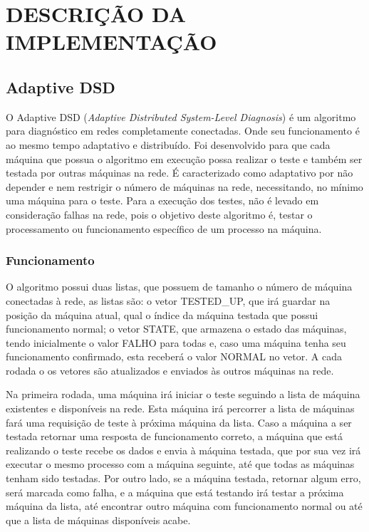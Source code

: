 
\chapter{DESCRIÇÃO DA IMPLEMENTAÇÃO}
\label{chap:descricao_da_implementacao}

\section{Adaptive DSD}
\label{sec:adaptiveDSD}

O Adaptive DSD (\textit{Adaptive Distributed System-Level Diagnosis}) é um algoritmo para diagnóstico em redes completamente conectadas. Onde seu funcionamento é ao mesmo tempo 
adaptativo e distribuído. Foi desenvolvido para que cada máquina que possua o algoritmo em execução possa realizar o teste e também ser testada por outras máquinas na rede.
É caracterizado como adaptativo por não depender e nem restrigir o número de máquinas na rede, necessitando, no mínimo uma máquina para o teste. Para a execução dos testes, não é levado
em consideração falhas na rede, pois o objetivo deste algoritmo é, testar o processamento ou funcionamento específico de um processo na máquina.

\subsection{Funcionamento}
\label{sub:adaptiveDSD_Funcionamento}
O algoritmo possui duas listas, que possuem de tamanho o número de máquina conectadas à rede, as listas são: o vetor TESTED\_UP, que irá guardar na posição da máquina atual, qual 
o índice da máquina testada que possui funcionamento normal; o vetor STATE, que armazena o estado das máquinas, tendo inicialmente o valor FALHO para todas e, caso uma máquina tenha seu 
funcionamento confirmado, esta receberá o valor NORMAL no vetor. A cada rodada o os vetores são atualizados e enviados às outros máquinas na rede.

Na primeira rodada, uma máquina irá iniciar o teste seguindo a lista de máquina existentes e disponíveis na rede. Esta máquina irá percorrer a
lista de máquinas fará uma requisição de teste à próxima máquina da lista. Caso a máquina a ser testada retornar uma resposta de funcionamento correto, a máquina que está realizando o 
teste recebe os dados e envia à máquina testada, que por sua vez irá executar o mesmo processo com a máquina seguinte, até que todas as máquinas tenham sido testadas. Por outro lado, se 
a máquina testada, retornar algum erro, será marcada como falha, e a máquina que está testando irá testar a próxima máquina da lista, até encontrar outro máquina com funcionamento normal 
ou até que a lista de máquinas disponíveis acabe.

